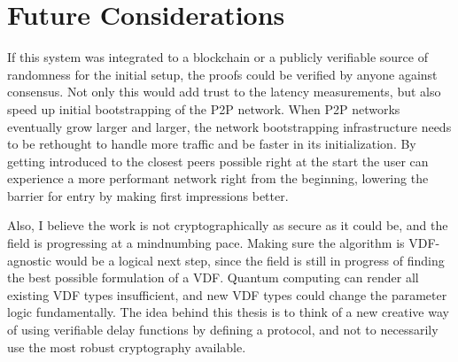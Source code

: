 \chapter{Future Considerations}
\label{Future Considerations}
If this system was integrated to a blockchain or a publicly verifiable source of randomness for the initial setup, the proofs could be verified by anyone against consensus. Not only this would add trust to the latency measurements, but also speed up initial bootstrapping of the P2P network. When P2P networks eventually grow larger and larger, the network bootstrapping infrastructure needs to be rethought to handle more traffic and be faster in its initialization. By getting introduced to the closest peers possible right at the start the user can experience a more performant network right from the beginning, lowering the barrier for entry by making first impressions better. 

Also, I believe the work is not cryptographically as secure as it could be, and the field is progressing at a mindnumbing pace. Making sure the algorithm is VDF-agnostic would be a logical next step, since the field is still in progress of finding the best possible formulation of a VDF. Quantum computing can render all existing VDF types insufficient, and new VDF types could change the parameter logic fundamentally. The idea behind this thesis is to think of a new creative way of using verifiable delay functions by defining a protocol, and not to necessarily use the most robust cryptography available. 

